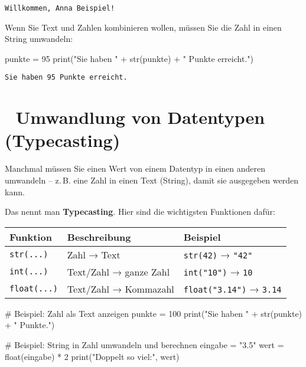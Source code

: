 \documentclass[
  letterpaper,
  DIV=11,
  numbers=noendperiod]{scrreprt}
\newenvironment{Shaded}{\begin{snugshade}}{\end{snugshade}}
\newcommand{\BuiltInTok}[1]{\textcolor[rgb]{0.00,0.23,0.31}{#1}}
\newcommand{\CommentTok}[1]{\textcolor[rgb]{0.37,0.37,0.37}{#1}}
\newcommand{\DecValTok}[1]{\textcolor[rgb]{0.68,0.00,0.00}{#1}}
\newcommand{\NormalTok}[1]{\textcolor[rgb]{0.00,0.23,0.31}{#1}}
\newcommand{\OperatorTok}[1]{\textcolor[rgb]{0.37,0.37,0.37}{#1}}
\newcommand{\StringTok}[1]{\textcolor[rgb]{0.13,0.47,0.30}{#1}}
\begin{document}
\begin{verbatim}
Willkommen, Anna Beispiel!
\end{verbatim}

Wenn Sie Text und Zahlen kombinieren wollen, müssen Sie die Zahl in
einen String umwandeln:

\begin{Shaded}
\begin{Highlighting}[]
\NormalTok{punkte }\OperatorTok{=} \DecValTok{95}
\BuiltInTok{print}\NormalTok{(}\StringTok{"Sie haben "} \OperatorTok{+} \BuiltInTok{str}\NormalTok{(punkte) }\OperatorTok{+} \StringTok{" Punkte erreicht."}\NormalTok{)}
\end{Highlighting}
\end{Shaded}

\begin{verbatim}
Sie haben 95 Punkte erreicht.
\end{verbatim}

\section{🔁 Umwandlung von Datentypen
(Typecasting)}\label{umwandlung-von-datentypen-typecasting}

Manchmal müssen Sie einen Wert von einem Datentyp in einen anderen
umwandeln -- z.\,B. eine Zahl in einen Text (String), damit sie
ausgegeben werden kann.

Das nennt man \textbf{Typecasting}. Hier sind die wichtigsten Funktionen
dafür:

\begin{longtable}[]{@{}lll@{}}
\toprule\noalign{}
Funktion & Beschreibung & Beispiel \\
\midrule\noalign{}
\endhead
\bottomrule\noalign{}
\endlastfoot
\texttt{str(...)} & Zahl → Text & \texttt{str(42)} → \texttt{"42"} \\
\texttt{int(...)} & Text/Zahl → ganze Zahl & \texttt{int("10")} →
\texttt{10} \\
\texttt{float(...)} & Text/Zahl → Kommazahl & \texttt{float("3.14")} →
\texttt{3.14} \\
\end{longtable}

\begin{Shaded}
\begin{Highlighting}[]
\CommentTok{\# Beispiel: Zahl als Text anzeigen}
\NormalTok{punkte }\OperatorTok{=} \DecValTok{100}
\BuiltInTok{print}\NormalTok{(}\StringTok{"Sie haben "} \OperatorTok{+} \BuiltInTok{str}\NormalTok{(punkte) }\OperatorTok{+} \StringTok{" Punkte."}\NormalTok{)}

\CommentTok{\# Beispiel: String in Zahl umwandeln und berechnen}
\NormalTok{eingabe }\OperatorTok{=} \StringTok{"3.5"}
\NormalTok{wert }\OperatorTok{=} \BuiltInTok{float}\NormalTok{(eingabe) }\OperatorTok{*} \DecValTok{2}
\BuiltInTok{print}\NormalTok{(}\StringTok{"Doppelt so viel:"}\NormalTok{, wert)}
\end{Highlighting}
\end{Shaded}
\end{document}
